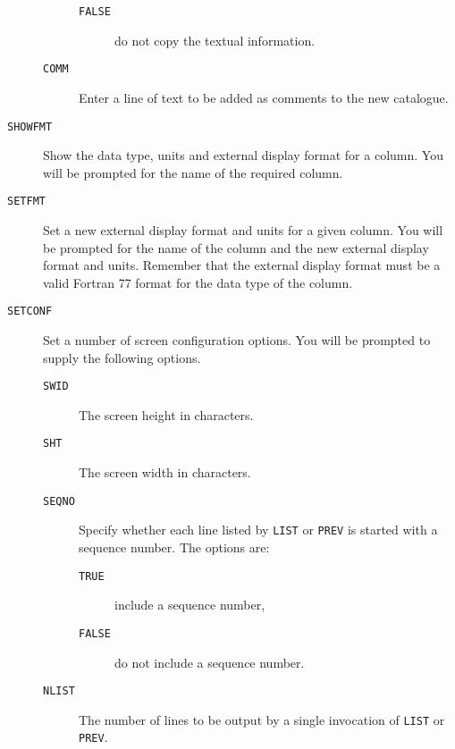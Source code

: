 \documentclass[twoside,11pt]{starlink}
\begin{document}
\begin{description}
\begin{description}
\begin{description}
      \item[ \texttt{FALSE} ] do not copy the textual information.

    \end{description}

    \item[ \texttt{COMM} ] Enter a line of text to be added as comments to
     the new catalogue.

  \end{description}

  \item[ \texttt{SHOWFMT} ] Show the data type, units and external display
   format for a column. You will be prompted for the name of the
   required column.

  \item[ \texttt{SETFMT} ] Set a new external display format and units
   for a given column. You will be prompted for the name of the
   column and the new external display format and units. Remember that
   the external display format must be a valid Fortran 77 format for
   the data type of the column.

  \item[ \texttt{SETCONF} ] Set a number of screen configuration options.
   You will be prompted to supply the following options.

  \begin{description}

    \item[ \texttt{SWID} ] The screen height in characters.

    \item[ \texttt{SHT} ] The screen width in characters.

    \item[ \texttt{SEQNO} ] Specify whether each line listed by
     \texttt{LIST} or \texttt{PREV} is started with a sequence number.
     The options are:

    \begin{description}

      \item[ \texttt{TRUE} ] include a sequence number,

      \item[ \texttt{FALSE} ] do not include a sequence number.

    \end{description}

    \item[ \texttt{NLIST} ] The number of lines to be output by a single
     invocation of \texttt{LIST} or \texttt{PREV}.


\end{description}
\end{description}
\end{document}
